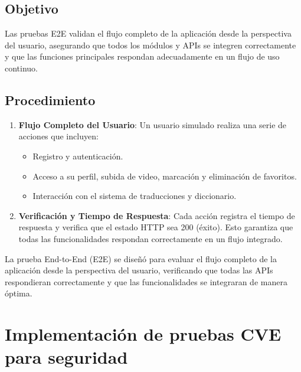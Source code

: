 \subsection{Objetivo}
Las pruebas E2E validan el flujo completo de la aplicación desde la perspectiva del usuario, asegurando que todos los módulos y APIs se integren correctamente y que las funciones principales respondan adecuadamente en un flujo de uso continuo.

\subsection{Procedimiento}
\begin{enumerate}
    \item \textbf{Flujo Completo del Usuario}: Un usuario simulado realiza una serie de acciones que incluyen:
    \begin{itemize}
        \item Registro y autenticación.
        \item Acceso a su perfil, subida de video, marcación y eliminación de favoritos.
        \item Interacción con el sistema de traducciones y diccionario.
    \end{itemize}
    \item \textbf{Verificación y Tiempo de Respuesta}: Cada acción registra el tiempo de respuesta y verifica que el estado HTTP sea 200 (éxito). Esto garantiza que todas las funcionalidades respondan correctamente en un flujo integrado.
\end{enumerate}

La prueba End-to-End (E2E) se diseñó para evaluar el flujo completo de la aplicación desde la perspectiva del usuario, verificando que todas las APIs respondieran correctamente y que las funcionalidades se integraran de manera óptima. 

\section{Implementación de pruebas CVE para seguridad}

